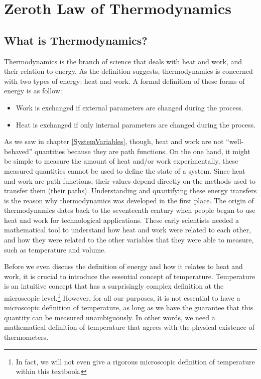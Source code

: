 \documentclass[
  9pt,
]{extbook}
\providecommand{\tightlist}{%
  \setlength{\itemsep}{0pt}\setlength{\parskip}{0pt}}
\theoremstyle{definition}
\theoremstyle{definition}
\theoremstyle{definition}
\theoremstyle{remark}
\begin{document}
\hypertarget{ZerothLaw}{%
\chapter{Zeroth Law of Thermodynamics}\label{ZerothLaw}}

\hypertarget{what-is-thermodynamics}{%
\section{What is Thermodynamics?}\label{what-is-thermodynamics}}

Thermodynamics is the branch of science that deals with heat and work, and their relation to energy. As the definition suggests, thermodynamics is concerned with two types of energy: heat and work. A formal definition of these forms of energy is as follow:

\begin{itemize}
\tightlist
\item
  Work is exchanged if external parameters are changed during the process.
\item
  Heat is exchanged if only internal parameters are changed during the process.
\end{itemize}

As we saw in chapter \ref{SystemVariables}, though, heat and work are not ``well-behaved'' quantities because they are path functions. On the one hand, it might be simple to measure the amount of heat and/or work experimentally, these measured quantities cannot be used to define the state of a system. Since heat and work are path functions, their values depend directly on the methods used to transfer them (their paths). Understanding and quantifying these energy transfers is the reason why thermodynamics was developed in the first place. The origin of thermodynamics dates back to the seventeenth century when people began to use heat and work for technological applications. These early scientists needed a mathematical tool to understand how heat and work were related to each other, and how they were related to the other variables that they were able to measure, such as temperature and volume.

Before we even discuss the definition of energy and how it relates to heat and work, it is crucial to introduce the essential concept of temperature. Temperature is an intuitive concept that has a surprisingly complex definition at the microscopic level.\footnote{In fact, we will not even give a rigorous microscopic definition of temperature within this textbook.} However, for all our purposes, it is not essential to have a microscopic definition of temperature, as long as we have the guarantee that this quantity can be measured unambiguously. In other words, we need a mathematical definition of temperature that agrees with the physical existence of thermometers.
\end{document}
